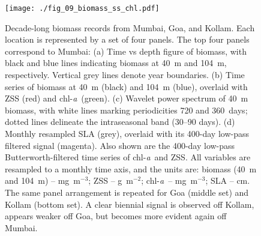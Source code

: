 \documentclass[authoryear,review,11pt]{elsarticle}
\newcommand{\chla}{chl-{\emph{a}}}
\begin{document}
\begin{figure}[htbp]
	\centering
	\texttt{[image: ./fig\_09\_biomass\_ss\_chl.pdf]} 
	\captionsetup{justification=justified,font=footnotesize,skip=0.05\baselineskip,width=\textwidth}
	\caption{Decade-long biomass records from Mumbai, Goa, and Kollam. Each location is represented by a set of four panels. The top four panels correspond to Mumbai: (a) Time vs depth figure of biomass, with black and blue lines indicating biomass at 40~m and 104~m, respectively. Vertical grey lines denote year boundaries. (b) Time series of biomass at 40~m (black) and 104~m (blue), overlaid with ZSS (red) and \chla\ (green). (c) Wavelet power spectrum of 40~m biomass, with white lines marking periodicities 720 and 360~days; dotted lines delineate the intraseasonal band (30--90 days). (d) Monthly resampled SLA (grey), overlaid with its 400-day low-pass filtered signal (magenta). Also shown are the 400-day low-pass Butterworth-filtered time series of \chla\ and ZSS. All variables are resampled to a monthly time axis, and the units are: biomass (40~m and 104~m) -- mg~m$^{-3}$; ZSS -- g~m$^{-2}$; \chla\ -- mg~m$^{-3}$; SLA -- cm. The same panel arrangement is repeated for Goa (middle set) and Kollam (bottom set). A clear biennial signal is observed off Kollam, appears weaker off Goa, but becomes more evident again off Mumbai.}
	\label{fig:biomass_ss_chl}
\end{figure}

\end{document}
